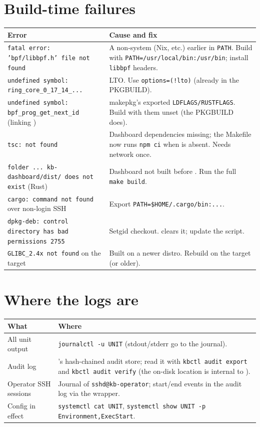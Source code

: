 \section{Build-time failures}
\begin{center}\small
\begin{tabularx}{\textwidth}{@{}L{4.9cm}Y@{}}
\toprule
\textbf{Error} & \textbf{Cause and fix}\\
\midrule
\texttt{fatal error: 'bpf/libbpf.h' file not found} & A non-system  (Nix, etc.) earlier in \texttt{PATH}. Build with \texttt{PATH=/usr/local/bin:/usr/bin}; install \texttt{libbpf} headers.\\
\texttt{undefined symbol: ring\_core\_0\_17\_14\_...} &  LTO. Use \texttt{options=(!lto)} (already in the PKGBUILD).\\
\texttt{undefined symbol: bpf\_prog\_get\_next\_id} (linking ) & makepkg's exported \texttt{LDFLAGS/RUSTFLAGS}. Build with them unset (the PKGBUILD does).\\
\texttt{tsc: not found} & Dashboard dependencies missing; the Makefile now runs \texttt{npm ci} when  is absent. Needs network once.\\
\texttt{folder ... kb-dashboard/dist/ does not exist} (Rust) & Dashboard not built before . Run the full \texttt{make build}.\\
\texttt{cargo: command not found} over non-login SSH & Export \texttt{PATH=\$HOME/.cargo/bin:...}.\\
\texttt{dpkg-deb: control directory has bad permissions 2755} & Setgid checkout.  clears it; update the script.\\
\texttt{GLIBC\_2.4x not found} on the target & Built on a newer distro. Rebuild on the target (or older).\\
\bottomrule
\end{tabularx}
\end{center}

\section{Where the logs are}
\begin{center}\small
\begin{tabularx}{\textwidth}{@{}L{4.6cm}Y@{}}
\toprule
\textbf{What} & \textbf{Where}\\
\midrule
All unit output & \texttt{journalctl -u UNIT} (stdout/stderr go to the journal).\\
Audit log & 's hash-chained audit store; read it with \texttt{kbctl audit export} and \texttt{kbctl audit verify} (the on-disk location is internal to ).\\
Operator SSH sessions & Journal of \texttt{sshd@kb-operator}; start/end events in the audit log via the wrapper.\\
Config in effect & \texttt{systemctl cat UNIT}, \texttt{systemctl show UNIT -p Environment,ExecStart}.\\
\bottomrule
\end{tabularx}
\end{center}


